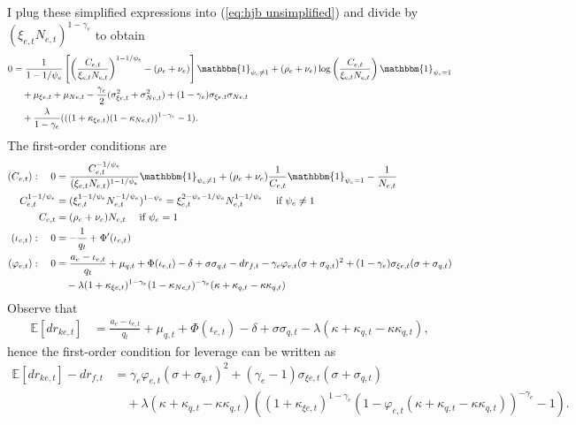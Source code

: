 \documentclass[12 pt, oneside]{article}
\theoremstyle{definition}
\theoremstyle{definition}
\theoremstyle{definition}
\newcommand{\E}{\mathbb{E}}
\begin{document}
I plug these simplified expressions into (\ref{eq:hjb unsimplified}) and divide by $(\xi_{e, t}N_{e, t})^{1 - \gamma_e}$ to obtain
\begin{equation}
\label{eq:hjb simplified step 1}
\begin{split}
  0 & = \frac{1}{1 - 1/\psi_e}\left[\left(\frac{C_{e, t}}{\xi_{e, t}N_{e, t}}\right)^{1 - 1/\psi_e} - (\rho_e + \nu_e)\right]\mathbbm{1}_{\psi_e\neq 1} + (\rho_e + \nu_e)\log\left(\frac{C_{e, t}}{\xi_{e, t}N_{e, t}}\right)\mathbbm{1}_{\psi_e = 1}\\ %
  &\quad + \mu_{\xi e, t} + \mu_{Ne, t}  - \frac{\gamma_e}{2}(\sigma_{\xi e , t}^2 + \sigma_{Ne, t}^2) + (1 - \gamma_e)\sigma_{\xi e, t} \sigma_{Ne, t}\\
  &\quad + \frac{\lambda}{1 - \gamma_e}(((1 + \kappa_{\xi e, t})(1 - \kappa_{Ne, t}))^{1 - \gamma_e} - 1).
\end{split}
\end{equation}
The first-order conditions are
\begin{align*}
  (C_{e, t}):\quad 0 & =\frac{C_{e, t}^{-1 / \psi_e}}{(\xi_{e, t}N_{e, t})^{1 - 1/\psi_e}}\mathbbm{1}_{\psi_e \neq 1} + (\rho_e + \nu_e)\frac{1}{C_{e, t}}\mathbbm{1}_{\psi_e = 1} - \frac{1}{N_{e, t}}\\
  C_{e, t}^{1 - 1/\psi_e} & = (\xi_{e, t}^{1 - 1/\psi_e}N_{e, t}^{ - 1/\psi_e})^{1 - \psi_e} = \xi_{e, t}^{2 - \psi_e - 1/\psi_e}N_{e, t}^{1 - 1/\psi_e}\quad \text{ if $\psi_e \neq 1$}\\
  C_{e, t} & = (\rho_e + \nu_e) N_{e, t} \quad \text{ if $\psi_e = 1$}\\
  (\iota_{e, t}):\quad 0 & = -\frac{1}{q_t} + \Phi'(\iota_{e, t})\\
    (\varphi_{e, t}): \quad 0 & = \frac{a_e - \iota_{e, t}}{q_t} + \mu_{q, t} + \Phi(\iota_{e, t}) - \delta + \sigma\sigma_{q, t}- dr_{f, t} - \gamma_e\varphi_{e, t}(\sigma + \sigma_{q, t})^2   + (1 - \gamma_e)\sigma_{\xi e, t}(\sigma + \sigma_{q, t})\\
                              &\quad  - \lambda(1 + \kappa_{\xi e, t})^{1 - \gamma_e}(1  - \kappa_{Ne, t})^{- \gamma_e}(\kappa + \kappa_{q, t} - \kappa\kappa_{q, t})
\end{align*}
Observe that
\begin{align*}
  \E[dr_{ke, t}] & = \frac{a_e - \iota_{e, t}}{q_t} + \mu_{q, t} + \Phi(\iota_{e, t}) - \delta + \sigma\sigma_{q, t} - \lambda(\kappa + \kappa_{q, t} - \kappa\kappa_{q, t}),
\end{align*}
hence the first-order condition for leverage can be written as
\begin{align*}
  \E[dr_{ke, t}] - dr_{f, t} & = \gamma_e\varphi_{e, t}(\sigma + \sigma_{q, t})^2 + (\gamma_e - 1) \sigma_{\xi e, t}(\sigma + \sigma_{q, t}) \\
                             &\quad + \lambda(\kappa + \kappa_{q, t} - \kappa\kappa_{q, t})((1 + \kappa_{\xi e, t})^{1 - \gamma_e}(1 - \varphi_{e, t}(\kappa + \kappa_{q, t} - \kappa\kappa_{q, t}))^{ - \gamma_e} - 1).
\end{align*}
\end{document}
